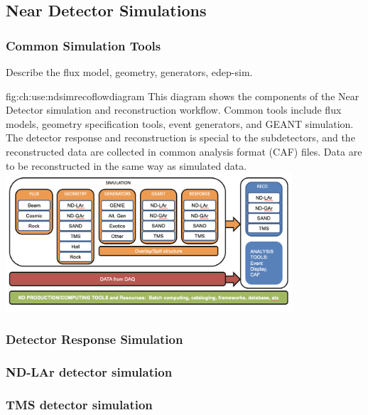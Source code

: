 \documentclass[../main-v1.tex]{subfiles}
\begin{document}
\subsection{Near Detector Simulations}\label{ch:use:nd}


\subsubsection{Common Simulation Tools}

Describe the flux model, geometry, generators, edep-sim.

\begin{dunefigure}
{fig:ch:use:ndsimrecoflowdiagram}
{This diagram shows the components of the Near Detector simulation and reconstruction workflow.  Common tools include flux models, geometry specification tools, event generators, and GEANT simulation.  The detector response and reconstruction is special to the subdetectors, and the reconstructed data are collected in common analysis format (CAF) files.  Data are to be reconstructed in the same way as simulated data.}
\includegraphics[width=0.8\textwidth]{graphics/Algo/ND_sim_reco_flowdiagram.png}
\end{dunefigure}

\subsubsection{Detector Response Simulation}

\subsubsection{ND-LAr detector simulation}
\subsubsection{TMS detector simulation}
\end{document}
